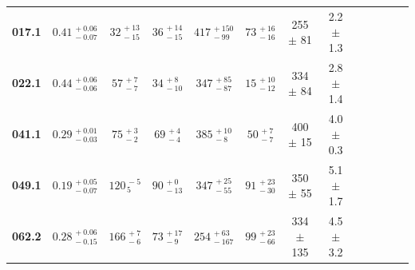 \begin{table}
{\begin{tabular}{lcccccccccccc}
	\textbf{017.1} & $0.41_{\, -0.07}^{\, +0.06}$ & $32_{\, -15}^{\, +13}$ & $36_{\, -15}^{\, +14}$ & $417_{\, -99}^{\, +150}$ & $73_{\, -16}^{\, +16}$ & 255 $\pm$ 81 & 2.2 $\pm$ 1.3
	\\[1.5mm]
	
	
	\textbf{022.1} & $0.44_{\, -0.06}^{\, +0.06}$ & $57_{\, -7}^{\, +7}$ & $34_{\, -10}^{\, +8}$ & $347_{\, -87}^{\, +85}$ & $15_{\, -12}^{\, +10}$ & 334 $\pm$ 84 & 2.8 $\pm$ 1.4
	\\[1.5mm]
	
	
	\textbf{041.1} & $0.29_{\, -0.03}^{\, +0.01}$ & $75_{\, -2}^{\, +3}$ & $69_{\, -4}^{\, +4}$ & $385_{\, -8}^{\, +10}$ & $50_{\, -7}^{\, +7}$ & 400 $\pm$ 15 & 4.0 $\pm$ 0.3
	\\[1.5mm]
	
	\textbf{049.1} & $0.19_{\, -0.07}^{\, +0.05}$ & $120_{\, 5}^{\, -5}$ & $90_{\, -13}^{\, +0}$ & $347_{\, -55}^{\, +25}$ & $91_{\, -30}^{\, +23}$ & 350 $\pm$ 55 & 5.1 $\pm$ 1.7
	\\[1.5mm]
	
	\textbf{062.2} & $0.28_{\, -0.15}^{\, +0.06}$ & $166_{\, -6}^{\, +7}$ & $73_{\, -9}^{\, +17}$ & $254_{\, -167}^{\, +63}$ & $99_{\, -66}^{\, +23}$ & 334 $\pm$ 135 & 4.5 $\pm$ 3.2
	\\[1.5mm]
	

\end{tabular}}
\end{table}
